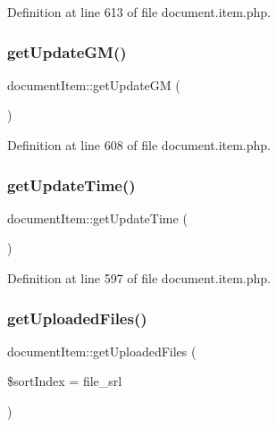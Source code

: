 Definition at line 613 of file document.\+item.\+php.

\hypertarget{classdocumentItem_a6bb6ee1c20e63af811ebd2c6993e898f}{}\label{classdocumentItem_a6bb6ee1c20e63af811ebd2c6993e898f} 
\subsubsection{\texorpdfstring{get\+Update\+G\+M()}{getUpdateGM()}}
{\footnotesize\ttfamily document\+Item\+::get\+Update\+GM (\begin{DoxyParamCaption}{ }\end{DoxyParamCaption})}



Definition at line 608 of file document.\+item.\+php.

\hypertarget{classdocumentItem_a026c6426bea71f9ab86a4f4a7dcff6d9}{}\label{classdocumentItem_a026c6426bea71f9ab86a4f4a7dcff6d9} 
\subsubsection{\texorpdfstring{get\+Update\+Time()}{getUpdateTime()}}
{\footnotesize\ttfamily document\+Item\+::get\+Update\+Time (\begin{DoxyParamCaption}{ }\end{DoxyParamCaption})}



Definition at line 597 of file document.\+item.\+php.

\hypertarget{classdocumentItem_a4ffff0d0a86cc44c6be0f46f644cdc42}{}\label{classdocumentItem_a4ffff0d0a86cc44c6be0f46f644cdc42} 
\subsubsection{\texorpdfstring{get\+Uploaded\+Files()}{getUploadedFiles()}}
{\footnotesize\ttfamily document\+Item\+::get\+Uploaded\+Files (\begin{DoxyParamCaption}\item[{}]{\$sort\+Index = {\ttfamily \textquotesingle{}file\+\_\+srl\textquotesingle{}} }\end{DoxyParamCaption})}



